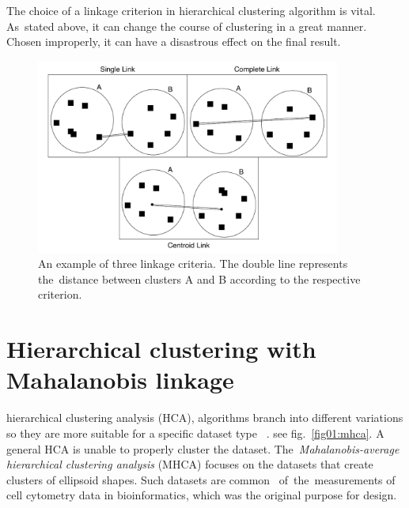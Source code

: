 The choice of a linkage criterion in hierarchical clustering algorithm is vital. As~stated above, it can change the course of clustering in a great manner. Chosen improperly, it can have a disastrous effect on the final result.

\begin{figure}\centering
	\includegraphics[width=10cm]{img/linkage_criteria}
	\caption{An example of three linkage criteria. The double line represents the~distance between clusters A and B according to the respective criterion.}
	\label{fig01:link}
\end{figure}

\section{Hierarchical clustering with Mahalanobis linkage}

 hierarchical clustering analysis (HCA), algorithms branch into different variations so they are more suitable for a specific dataset type~\cite{murtagh2008hierarchical} \cite{oh2004hierarchical} \cite{zhao2005hierarchical}.  see fig.~\ref{fig01:mhca}. A general HCA is unable to properly cluster the  dataset. The~\emph{Ma\-ha\-la\-no\-bis-average hierarchical clustering analysis} (MHCA) focuses on the datasets that create clusters of ellipsoid shapes. Such datasets are common \ of~the~measurements of cell cytometry data in bioinformatics, which was the original purpose for  design.

